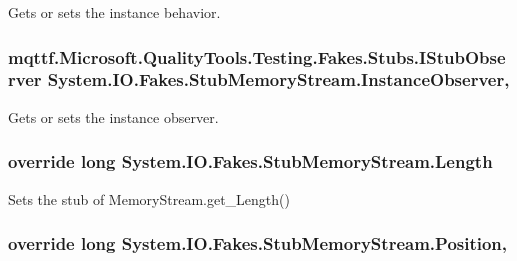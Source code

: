 Gets or sets the instance behavior.

\hypertarget{class_system_1_1_i_o_1_1_fakes_1_1_stub_memory_stream_abfb08a3e21e756f89c34133f08bed392}{
\subsubsection[{Instance\-Observer}]{\setlength{\rightskip}{0pt plus 5cm}mqttf.\-Microsoft.\-Quality\-Tools.\-Testing.\-Fakes.\-Stubs.\-I\-Stub\-Observer System.\-I\-O.\-Fakes.\-Stub\-Memory\-Stream.\-Instance\-Observer\hspace{0.3cm}{\ttfamily [get]}, {\ttfamily [set]}}}\label{class_system_1_1_i_o_1_1_fakes_1_1_stub_memory_stream_abfb08a3e21e756f89c34133f08bed392}


Gets or sets the instance observer.

\hypertarget{class_system_1_1_i_o_1_1_fakes_1_1_stub_memory_stream_afd220132666fb9e0633b5cd2d8fdc995}{
\subsubsection[{Length}]{\setlength{\rightskip}{0pt plus 5cm}override long System.\-I\-O.\-Fakes.\-Stub\-Memory\-Stream.\-Length\hspace{0.3cm}{\ttfamily [get]}}}\label{class_system_1_1_i_o_1_1_fakes_1_1_stub_memory_stream_afd220132666fb9e0633b5cd2d8fdc995}


Sets the stub of Memory\-Stream.\-get\-\_\-\-Length()

\hypertarget{class_system_1_1_i_o_1_1_fakes_1_1_stub_memory_stream_aa7e67c4cc12927ae84ad2d5550c10ab2}{
\subsubsection[{Position}]{\setlength{\rightskip}{0pt plus 5cm}override long System.\-I\-O.\-Fakes.\-Stub\-Memory\-Stream.\-Position\hspace{0.3cm}{\ttfamily [get]}, {\ttfamily [set]}}}\label{class_system_1_1_i_o_1_1_fakes_1_1_stub_memory_stream_aa7e67c4cc12927ae84ad2d5550c10ab2}


